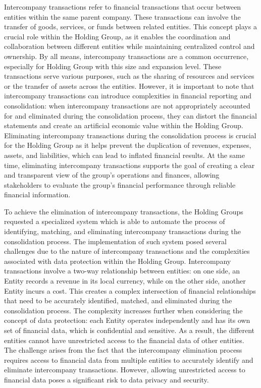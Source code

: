 \documentclass[12pt,a4paper,openright,twoside]{book}
\begin{document}
Intercompany transactions refer to financial transactions that occur between entities within the same parent company. 
%
These transactions can involve the transfer of goods, services, or funds between related entities.
%
This concept plays a crucial role within the Holding Group, as it enables the coordination and collaboration between different entities while maintaining centralized control and ownership.
%
By all means, intercompany transactions are a common occurrence, especially for Holding Group with this size and expansion level.
%
These transactions serve various purposes, such as the sharing of resources and services or the transfer of assets across the entities. 
%
However, it is important to note that intercompany transactions can introduce complexities in financial reporting and consolidation: when intercompany transactions are not appropriately accounted for and eliminated during the consolidation process, they can distort the financial statements and create an artificial economic value within the Holding Group.
%
Eliminating intercompany transactions during the consolidation process is crucial for the Holding Group as it helps prevent the duplication of revenues, expenses, assets, and liabilities, which can lead to inflated financial results.
%
At the same time, eliminating intercompany transactions supports the goal of creating a clear and transparent view of the group's operations and finances, allowing stakeholders to evaluate the group's financial performance through reliable financial information.

To achieve the elimination of intercompany transactions, the Holding Groups requested a specialized system which is able to automate the process of identifying, matching, and eliminating intercompany transactions during the consolidation process.
%
The implementation of such system posed several challenges due to the nature of intercompany transactions and the complexities associated with data protection within the Holding Group.
%
Intercompany transactions involve a two-way relationship between entities: on one side, an Entity records a revenue in its local currency, while on the other side, another Entity incurs a cost. 
%
This creates a complex intersection of financial relationships that need to be accurately identified, matched, and eliminated during the consolidation process.
%
The complexity increases further when considering the concept of data protection: each Entity operates independently and has its own set of financial data, which is confidential and sensitive. 
%
As a result, the different entities cannot have unrestricted access to the financial data of other entities.
%
The challenge arises from the fact that the intercompany elimination process requires access to financial data from multiple entities to accurately identify and eliminate intercompany transactions.
%
However, allowing unrestricted access to financial data poses a significant risk to data privacy and security.
\end{document}
